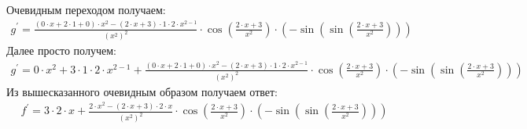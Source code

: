 \documentclass[12pt,a4paper]{scrartcl}
\begin{document}
Очевидным переходом получаем:
\begin{gather}\label{eq:1}g^\prime  = \frac{\left(0 \cdot x + 2 \cdot 1 + 0\right) \cdot x ^ {2} - \left(2 \cdot x + 3\right) \cdot 1 \cdot 2 \cdot x ^ {2 - 1}}{{ \left(x ^ {2}\right) } ^ {2}} \cdot  \cos{ \left(\frac{2 \cdot x + 3}{x ^ {2}}\right) }  \cdot  \left(- \sin{ \left( \sin{ \left(\frac{2 \cdot x + 3}{x ^ {2}}\right) } \right) } \right) \end{gather}
Далее просто получем:
\begin{gather}\label{eq:1}g^\prime  = 0 \cdot x ^ {2} + 3 \cdot 1 \cdot 2 \cdot x ^ {2 - 1} + \frac{\left(0 \cdot x + 2 \cdot 1 + 0\right) \cdot x ^ {2} - \left(2 \cdot x + 3\right) \cdot 1 \cdot 2 \cdot x ^ {2 - 1}}{{ \left(x ^ {2}\right) } ^ {2}} \cdot  \cos{ \left(\frac{2 \cdot x + 3}{x ^ {2}}\right) }  \cdot  \left(- \sin{ \left( \sin{ \left(\frac{2 \cdot x + 3}{x ^ {2}}\right) } \right) } \right) \end{gather}
Из вышесказанного очевидным образом получаем ответ:
\begin{gather}\label{eq:1}f^\prime  = 3 \cdot 2 \cdot x + \frac{2 \cdot x ^ {2} - \left(2 \cdot x + 3\right) \cdot 2 \cdot x}{{ \left(x ^ {2}\right) } ^ {2}} \cdot  \cos{ \left(\frac{2 \cdot x + 3}{x ^ {2}}\right) }  \cdot  \left(- \sin{ \left( \sin{ \left(\frac{2 \cdot x + 3}{x ^ {2}}\right) } \right) } \right) \end{gather}
\end{document}
